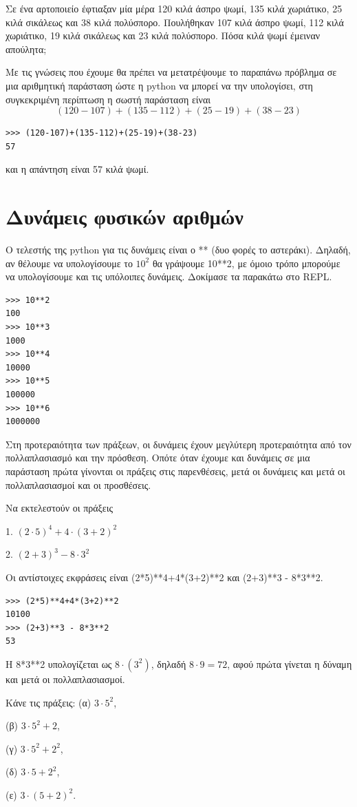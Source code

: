 \begin{exercise}
Σε ένα αρτοποιείο έφτιαξαν μία μέρα 120 κιλά άσπρο ψωμί, 135 κιλά χωριάτικο, 25 κιλά σικάλεως και 38 κιλά πολύσπορο. Πουλήθηκαν 107 κιλά άσπρο ψωμί, 112 κιλά χωριάτικο, 19 κιλά σικάλεως και 23 κιλά πολύσπορο. Πόσα κιλά ψωμί έμειναν απούλητα;
\end{exercise}
Με τις γνώσεις που έχουμε θα πρέπει να μετατρέψουμε το παραπάνω πρόβλημα σε μια αριθμητική παράσταση ώστε η python να μπορεί να την υπολογίσει, στη συγκεκριμένη περίπτωση η σωστή παράσταση είναι $$(120-107)+(135-112)+(25-19)+(38-23)$$
\begin{lstlisting}
>>> (120-107)+(135-112)+(25-19)+(38-23)
57
\end{lstlisting}
και η απάντηση είναι 57 κιλά ψωμί.

\section{Δυνάμεις φυσικών αριθμών}
Ο τελεστής της python για τις δυνάμεις είναι ο **  (δυο φορές το αστεράκι). Δηλαδή, αν θέλουμε να υπολογίσουμε το $10^2$ θα γράψουμε 10**2, με όμοιο τρόπο μπορούμε να υπολογίσουμε και τις υπόλοιπες δυνάμεις. Δοκίμασε τα παρακάτω στο REPL.
\begin{lstlisting}
>>> 10**2
100
>>> 10**3
1000
>>> 10**4
10000
>>> 10**5
100000
>>> 10**6
1000000
\end{lstlisting}
Στη προτεραιότητα των πράξεων, οι δυνάμεις έχουν μεγλύτερη προτεραιότητα από τον πολλαπλασιασμό και την πρόσθεση. Οπότε όταν έχουμε και δυνάμεις σε μια παράσταση πρώτα γίνονται οι πράξεις στις παρενθέσεις, μετά οι δυνάμεις και μετά οι πολλαπλασιασμοί και οι προσθέσεις.
\begin{exercise}
Να εκτελεστούν οι πράξεις 

 1. $(2\cdot 5)^4+4\cdot (3+2)^2$

 2. $(2+3)^3 - 8\cdot 3^2$

\end{exercise}
Οι αντίστοιχες εκφράσεις είναι (2*5)**4+4*(3+2)**2 και (2+3)**3 - 8*3**2.

\begin{lstlisting}
>>> (2*5)**4+4*(3+2)**2
10100
>>> (2+3)**3 - 8*3**2
53
\end{lstlisting}
H 8*3**2 υπολογίζεται ως $8\cdot (3^2)$, δηλαδή $8\cdot 9 = 72$, αφού πρώτα γίνεται η δύναμη και μετά οι πολλαπλασιασμοί.

\begin{exercise}
Κάνε τις πράξεις: 
(α) $3\cdot 5^2$, 

(β) $3\cdot 5^2 + 2$, 

(γ) $3\cdot5^2 + 2^2$, 

(δ) $3\cdot 5 + 2^2$, 

(ε) $3\cdot(5 + 2)^2$.
\end{exercise}

